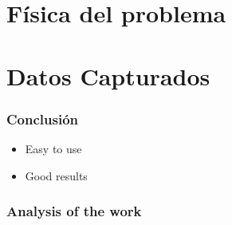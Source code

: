 \documentclass{beamer}
\begin{document}
\section{Física del problema}

\section{Datos Capturados}

\begin{frame}
  \frametitle{Conclusión}

  \begin{itemize}
    \item Easy to use
    \item Good results
  \end{itemize}
\end{frame}
\begin{frame}
  \frametitle{Analysis of the work}

\end{frame}
\end{document}
